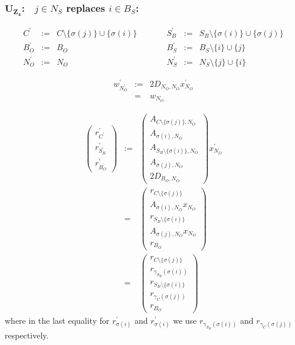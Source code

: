\documentclass[a4paper]{article}
\begin{document}
\subsubsection{$\mathbf{U_{Z_{4}}}$:$\quad j \in N_{S}$ replaces $i \in B_{S}$:}
\begin{equation}
\label{update:s_z_rep_s}
\begin{array}{ccccccc}
C^{\prime}      &:=&  C \setminus \{\sigma(j)\} \cup \{\sigma(i)\}
&\quad\quad&
S_{B}^{\prime}  &:=&  S_{B} \setminus  \{\sigma(i)\} \cup \{\sigma(j)\}   \\
B_{O}^{\prime}  &:=&  B_{O}
&\quad\quad&
B_{S}^{\prime}  &:=&  B_{S} \setminus \{i\} \cup \{j\} \\
N_{O}^{\prime}  &:=&  N_{O}
&\quad\quad&
N_{S}^{\prime}  &:=&  N_{S} \setminus \{j\} \cup \{i\} 
\end{array}
\end{equation}

\begin{eqnarray}
w_{N_{O}^{\prime}}^{\prime}
&:=&
2D_{N_{O}, N_{O}}x_{N_{O}}^{\prime}
\nonumber \\
&=&
w_{N_{O}}
\end{eqnarray}

\begin{eqnarray}
\left(
\begin{array}{c}
r_{C^{\prime}}^{\prime} \\
\hline
r_{S_{B}^{\prime}}^{\prime} \\
\hline
r_{B_{O}^{\prime}}^{\prime}
\end{array}
\right)
&:=&
\left(
\begin{array}{c}
A_{C \setminus \{\sigma(j)\}, N_{O}} \\
\hline
A_{\sigma(i), N_{O}} \\
\hline
A_{S_{B} \setminus \{\sigma(i)\}, N_{O}} \\
\hline
A_{\sigma(j), N_{O}} \\
\hline
2D_{B_{O}, N_{O}}
\end{array}
\right)
x_{N_{O}}^{\prime} 
\nonumber \\
&=&
\left(
\begin{array}{c}
r_{C \setminus \{\sigma(j)\}} \\
\hline
A_{\sigma(i), N_{O}}x_{N_{O}} \\
\hline
r_{S_{B} \setminus \{\sigma(i)\}} \\
\hline
A_{\sigma(j), N_{O}}x_{N_{O}} \\
\hline
r_{B_{O}}
\end{array}
\right)
\nonumber \\
&=&
\left(
\begin{array}{c}
r_{C \setminus \{\sigma(j)\}} \\
\hline
r_{\gamma_{S_{B}}(\sigma(i))} \\
\hline
r_{S_{B} \setminus \{\sigma(i)\}} \\
\hline
r_{\gamma_{C}(\sigma(j))} \\
\hline
r_{B_{O}}
\end{array}
\right)
\end{eqnarray}
where in the last equality for $r_{\sigma(i)}^{\prime}$ and
$r_{\sigma(i)}^{\prime}$ we use $r_{\gamma_{S_{B}}(\sigma(i))}$ and
$r_{\gamma_{C}(\sigma(j))}$ respectively.
\end{document}
